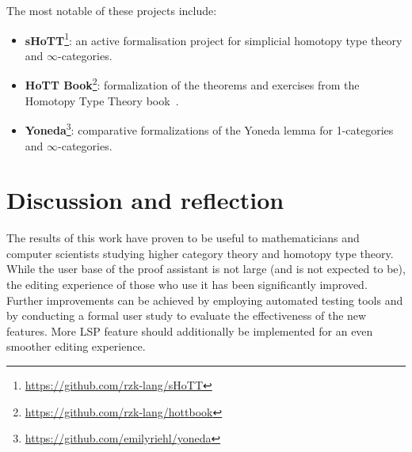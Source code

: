 The most notable of these projects include:
\begin{itemize}
  \item \textbf{sHoTT}\footnote{\url{https://github.com/rzk-lang/sHoTT}}:
        an active formalisation project for simplicial homotopy type theory and $\infty$-categories.
  \item \textbf{HoTT Book}\footnote{\url{https://github.com/rzk-lang/hottbook}}:
        formalization of the theorems and exercises from the Homotopy Type Theory book~\cite{hottbook}.
  \item \textbf{Yoneda}\footnote{\url{https://github.com/emilyriehl/yoneda}}:
        comparative formalizations of the Yoneda lemma for 1-categories and $\infty$-categories.
\end{itemize}

\section{Discussion and reflection}

The results of this work have proven to be useful to mathematicians and
computer scientists studying higher category theory and homotopy type theory.
While the user base of the proof assistant is not large (and is not expected to be),
the editing experience of those who use it has been significantly improved.
Further improvements can be achieved by employing automated testing tools and
by conducting a formal user study to evaluate the effectiveness of the new features.
More LSP feature should additionally be implemented for an even smoother \Rzk{} editing experience.
